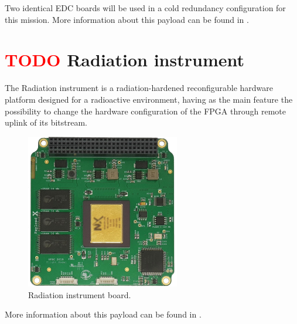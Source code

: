 Two identical EDC boards will be used in a cold redundancy configuration for this mission. More information about this payload can be found in \cite{edc}.

\section{ \textcolor{red}{TODO} Radiation instrument}

The Radiation instrument is a radiation-hardened reconfigurable hardware platform designed for a radioactive environment, having as the main feature the possibility to change the hardware configuration of the FPGA through remote uplink of its bitstream.

\begin{figure}[!ht]
    \begin{center}
        \includegraphics[width=0.6\textwidth]{figures/subsystems/payload-x-board}
        \caption{Radiation instrument board.}
        \label{fig:payload-x-board}
    \end{center}
\end{figure}

More information about this payload can be found in \cite{rigo2019}.



